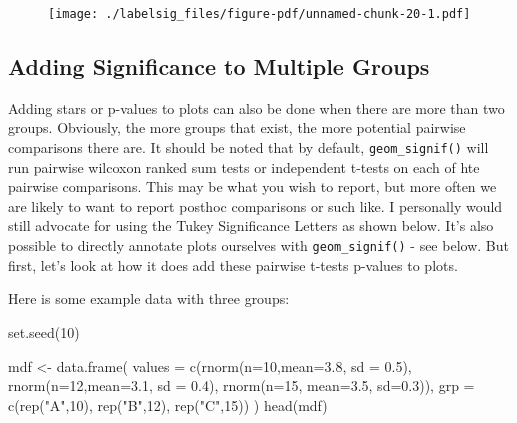 \documentclass[
  letterpaper,
  DIV=11,
  numbers=noendperiod]{scrreprt}
\newenvironment{Shaded}{\begin{snugshade}}{\end{snugshade}}
\newcommand{\AttributeTok}[1]{\textcolor[rgb]{0.40,0.45,0.13}{#1}}
\newcommand{\DecValTok}[1]{\textcolor[rgb]{0.68,0.00,0.00}{#1}}
\newcommand{\FloatTok}[1]{\textcolor[rgb]{0.68,0.00,0.00}{#1}}
\newcommand{\FunctionTok}[1]{\textcolor[rgb]{0.28,0.35,0.67}{#1}}
\newcommand{\NormalTok}[1]{\textcolor[rgb]{0.00,0.23,0.31}{#1}}
\newcommand{\OtherTok}[1]{\textcolor[rgb]{0.00,0.23,0.31}{#1}}
\newcommand{\StringTok}[1]{\textcolor[rgb]{0.13,0.47,0.30}{#1}}
\begin{document}
\begin{figure}[H]

{\centering \texttt{[image: ./labelsig\_files/figure-pdf/unnamed-chunk-20-1.pdf]}

}

\end{figure}

\hypertarget{adding-significance-to-multiple-groups}{%
\subsection{Adding Significance to Multiple
Groups}\label{adding-significance-to-multiple-groups}}

Adding stars or p-values to plots can also be done when there are more
than two groups. Obviously, the more groups that exist, the more
potential pairwise comparisons there are. It should be noted that by
default, \texttt{geom\_signif()} will run pairwise wilcoxon ranked sum
tests or independent t-tests on each of hte pairwise comparisons. This
may be what you wish to report, but more often we are likely to want to
report posthoc comparisons or such like. I personally would still
advocate for using the Tukey Significance Letters as shown below. It's
also possible to directly annotate plots ourselves with
\texttt{geom\_signif()} - see below. But first, let's look at how it
does add these pairwise t-tests p-values to plots.

Here is some example data with three groups:

\begin{Shaded}
\begin{Highlighting}[]
\FunctionTok{set.seed}\NormalTok{(}\DecValTok{10}\NormalTok{)}

\NormalTok{mdf }\OtherTok{\textless{}{-}} \FunctionTok{data.frame}\NormalTok{(}
  \AttributeTok{values =} \FunctionTok{c}\NormalTok{(}\FunctionTok{rnorm}\NormalTok{(}\AttributeTok{n=}\DecValTok{10}\NormalTok{,}\AttributeTok{mean=}\FloatTok{3.8}\NormalTok{, }\AttributeTok{sd =} \FloatTok{0.5}\NormalTok{), }
             \FunctionTok{rnorm}\NormalTok{(}\AttributeTok{n=}\DecValTok{12}\NormalTok{,}\AttributeTok{mean=}\FloatTok{3.1}\NormalTok{, }\AttributeTok{sd =} \FloatTok{0.4}\NormalTok{),}
             \FunctionTok{rnorm}\NormalTok{(}\AttributeTok{n=}\DecValTok{15}\NormalTok{, }\AttributeTok{mean=}\FloatTok{3.5}\NormalTok{, }\AttributeTok{sd=}\FloatTok{0.3}\NormalTok{)),}
  \AttributeTok{grp =} \FunctionTok{c}\NormalTok{(}\FunctionTok{rep}\NormalTok{(}\StringTok{"A"}\NormalTok{,}\DecValTok{10}\NormalTok{), }\FunctionTok{rep}\NormalTok{(}\StringTok{"B"}\NormalTok{,}\DecValTok{12}\NormalTok{), }\FunctionTok{rep}\NormalTok{(}\StringTok{"C"}\NormalTok{,}\DecValTok{15}\NormalTok{))}
\NormalTok{)}
\FunctionTok{head}\NormalTok{(mdf)}
\end{Highlighting}
\end{Shaded}
\end{document}
